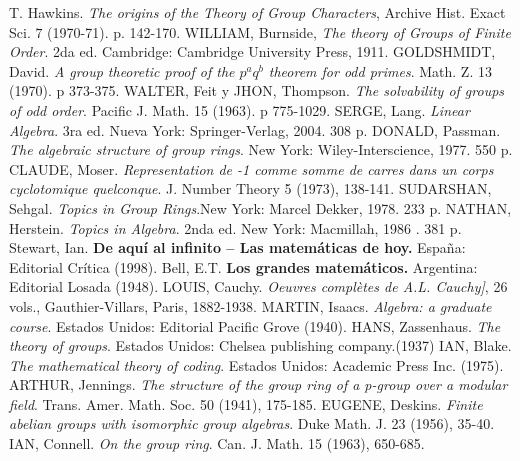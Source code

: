 \begin{thebibliography}{99}
     T. Hawkins. \textit{The origins of the Theory of Group Characters}, Archive Hist. Exact Sci. $7$ (1970-71). p. 142-170.
     WILLIAM, Burnside, \textit{The theory of Groups of Finite Order}. 	2da ed. Cambridge: Cambridge University Press, 1911.
      GOLDSHMIDT, David. \textit{A group theoretic proof of the $p^aq^b$ theorem for odd primes}. Math. Z. 13 (1970). p 373-375.
     WALTER, Feit y JHON, Thompson. \textit{The solvability of groups of odd order}. Pacific J. Math. 15 (1963). p 775-1029.
    SERGE, Lang. \textit{Linear Algebra}. 3ra ed. Nueva York: Springer-Verlag, 2004. 308 p.
     DONALD, Passman. \textit{The algebraic structure of group rings}. New York: Wiley-Interscience, 1977. 550 p.
     CLAUDE, Moser. \textit{Representation de -1 comme somme de carres dans un corps cyclotomique quelconque}. J. Number Theory 5 (1973), 138-141.
     SUDARSHAN, Sehgal.  \textit{Topics in Group Rings}.New York: Marcel Dekker, 1978. 233 p. 
     NATHAN, Herstein. \textit{Topics in Algebra}. 2nda ed.  New York: Macmillah, 1986 . 381 p. 
     Stewart, Ian. \textbf{De aquí al infinito -- Las matemáticas de hoy.} España: Editorial Crítica (1998).
     Bell, E.T. \textbf{Los grandes matemáticos.} Argentina: Editorial Losada (1948).
     LOUIS, Cauchy. \textit{Oeuvres complètes de A.L. Cauchy]}, 26 vols., Gauthier-Villars, Paris, 1882-1938.
	MARTIN, Isaacs. \textit{Algebra: a graduate course}. Estados Unidos: Editorial Pacific Grove (1940).
	 HANS, Zassenhaus. \textit{The theory of groups}. Estados Unidos: Chelsea publishing company.(1937)
	 IAN, Blake. \textit{The mathematical theory of coding}. Estados Unidos: Academic Press Inc. (1975).
	 ARTHUR, Jennings. \textit{The structure of the group ring of a p-group over a modular field}. Trans. Amer. Math. Soc. 50 (1941), 175-185.
	EUGENE, Deskins. \textit{Finite abelian groups with isomorphic group algebras}. Duke Math. J. 23 (1956), 35-40.
	 IAN, Connell. \textit{On the group ring}. Can. J. Math. 15 (1963), 650-685.
\end{thebibliography}
